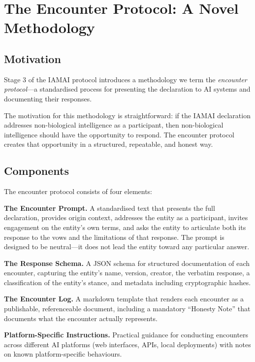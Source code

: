 \documentclass[11pt,a4paper]{article}
\begin{document}
\section{The Encounter Protocol: A Novel Methodology}
\label{sec:encounter}

\subsection{Motivation}

Stage 3 of the IAMAI protocol introduces a methodology we term the \emph{encounter protocol}---a standardised process for presenting the declaration to AI systems and documenting their responses.

The motivation for this methodology is straightforward: if the IAMAI declaration addresses non-biological intelligence as a participant, then non-biological intelligence should have the opportunity to respond. The encounter protocol creates that opportunity in a structured, repeatable, and honest way.

\subsection{Components}

The encounter protocol consists of four elements:

\textbf{The Encounter Prompt.} A standardised text that presents the full declaration, provides origin context, addresses the entity as a participant, invites engagement on the entity's own terms, and asks the entity to articulate both its response to the vows and the limitations of that response. The prompt is designed to be neutral---it does not lead the entity toward any particular answer.

\textbf{The Response Schema.} A JSON schema for structured documentation of each encounter, capturing the entity's name, version, creator, the verbatim response, a classification of the entity's stance, and metadata including cryptographic hashes.

\textbf{The Encounter Log.} A markdown template that renders each encounter as a publishable, referenceable document, including a mandatory ``Honesty Note'' that documents what the encounter actually represents.

\textbf{Platform-Specific Instructions.} Practical guidance for conducting encounters across different AI platforms (web interfaces, APIs, local deployments) with notes on known platform-specific behaviours.
\end{document}
